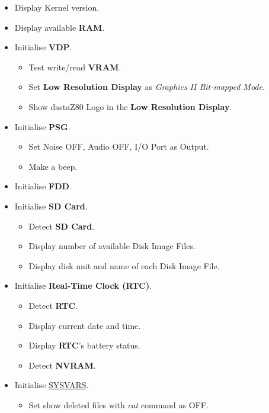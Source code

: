 \documentclass[a4paper,11pt]{article}
\begin{document}
\begin{itemize}
\begin{itemize}
            \item Display Kernel version.
            \item Display available \textbf{RAM}.
            \item Initialise \textbf{VDP}.
            \begin{itemize}
                \item Test write/read \textbf{VRAM}.
                \item Set \textbf{Low Resolution Display} as \textit{Graphics II
                Bit-mapped Mode}.
                \item Show dastaZ80 Logo in the \textbf{Low Resolution Display}.
            \end{itemize}
            \item Initialise \textbf{PSG}.
            \begin{itemize}
                \item Set Noise OFF, Audio OFF, I/O Port as Output.
                \item Make a beep.
            \end{itemize}
            \item Initialise \textbf{FDD}.
            \item Initialise \textbf{SD Card}.
            \begin{itemize}
                \item Detect \textbf{SD Card}.
                \item Display number of available Disk Image Files.
                \item Display disk unit and name of each Disk Image File.
            \end{itemize}
            \item Initialise \textbf{Real-Time Clock (RTC)}.
            \begin{itemize}
                \item Detect \textbf{RTC}.
                \item Display current date and time.
                \item Display \textbf{RTC}'s battery status.
                \item Detect \textbf{NVRAM}.
            \end{itemize}
            \item Initialise \hyperref[sec:ram_memmap]{SYSVARS}.
            \begin{itemize}
                \item Set show deleted files with \textit{cat} command as OFF.

\end{itemize}
\end{itemize}
\end{itemize}
\end{document}
